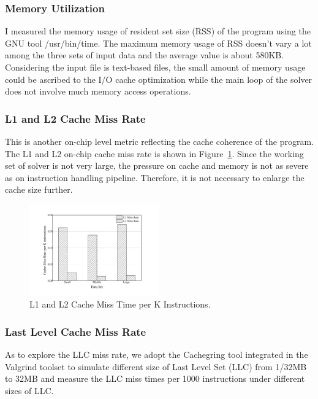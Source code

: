 \subsubsection{Memory Utilization}
I measured the memory usage of resident set size (RSS) of the program using the GNU tool /usr/bin/time. The maximum memory usage of RSS doesn't vary a lot among the three sets of input data and the average value is about 580KB. Considering the input file is text-based files, the small amount of memory usage could be ascribed to the I/O cache optimization while the main loop of the solver does not involve much memory access operations. 

\subsubsection{L1 and L2 Cache Miss Rate}
This is another on-chip level metric reflecting the cache coherence of the program. The L1 and L2 on-chip cache miss rate is shown in Figure~\ref{fig:cache_miss}. Since the working set of solver is not very large, the pressure on cache and memory is not as severe as on instruction handling pipeline. Therefore, it is not necessary to enlarge the cache size further.

\begin{figure}
\centering
\includegraphics[width=0.50\textwidth]{graph/cache_miss.pdf}
\caption{L1 and L2 Cache Miss Time per K Instructions.}
\label{fig:cache_miss}
\end{figure}

\subsubsection{Last Level Cache Miss Rate}
As to explore the LLC miss rate, we adopt the Cachegring tool integrated in the Valgrind toolset to simulate different size of Last Level Set (LLC) from 1/32MB to 32MB and measure the LLC miss times per 1000 instructions under different sizes of LLC. 

